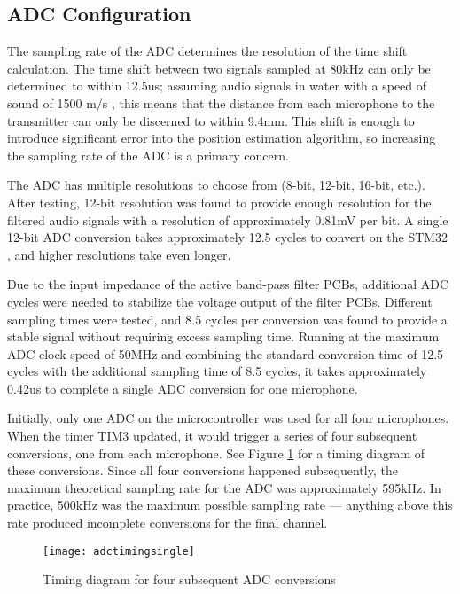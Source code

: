\documentclass[11pt]{ucthesisCP}
\begin{document}
\subsection{ADC Configuration} \label{ssec:3s7s2}
The sampling rate of the ADC determines the resolution of the time shift calculation. The time shift between two signals sampled at 80kHz can only be determined to within 12.5us; assuming audio signals in water with a speed of sound of 1500 m/s \cite{computational}, this means that the distance from each microphone to the transmitter can only be discerned to within 9.4mm. This shift is enough to introduce significant error into the position estimation algorithm, so increasing the sampling rate of the ADC is a primary concern.

The ADC has multiple resolutions to choose from (8-bit, 12-bit, 16-bit, etc.). After testing, 12-bit resolution was found to provide enough resolution for the filtered audio signals with a resolution of approximately 0.81mV per bit. A single 12-bit ADC conversion takes approximately 12.5 cycles to convert on the STM32 \cite{stmdatasheet}, and higher resolutions take even longer.

Due to the input impedance of the active band-pass filter PCBs, additional ADC cycles were needed to stabilize the voltage output of the filter PCBs. Different sampling times were tested, and 8.5 cycles per conversion was found to provide a stable signal without requiring excess sampling time. Running at the maximum ADC clock speed of 50MHz and combining the standard conversion time of 12.5 cycles with the additional sampling time of 8.5 cycles, it takes approximately 0.42us to complete a single ADC conversion for one microphone.

Initially, only one ADC on the microcontroller was used for all four microphones. When the timer TIM3 updated, it would trigger a series of four subsequent conversions, one from each microphone. See Figure \ref{fig:adctimingsingle} for a timing diagram of these conversions. Since all four conversions happened subsequently, the maximum theoretical sampling rate for the ADC was approximately 595kHz. In practice, 500kHz was the maximum possible sampling rate --- anything above this rate produced incomplete conversions for the final channel.

\begin{figure}[htbp]
	\centering
	\texttt{[image: adctimingsingle]}
	\caption{Timing diagram for four subsequent ADC conversions \cite{stmdatasheet}}
	\label{fig:adctimingsingle}
\end{figure}
\end{document}
